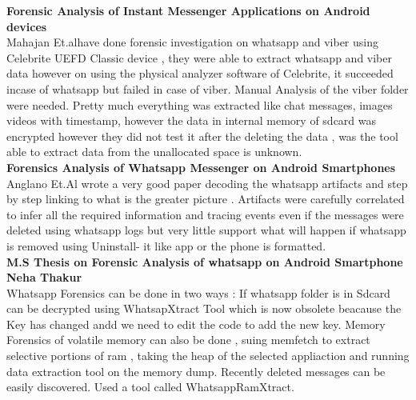 \textbf{Forensic Analysis of Instant Messenger Applications on Android devices}\\
Mahajan Et.al\cite{mahajan2013}have done forensic investigation on whatsapp and viber using Celebrite UEFD Classic device , they were able to extract whatsapp and viber data however on using the physical analyzer software of Celebrite, it succeeded incase of whatsapp but failed in case of viber. Manual Analysis of the viber folder were needed. Pretty much everything was extracted like chat messages, images videos with timestamp, however the data in internal memory of sdcard was encrypted however they did not test it after the deleting the data , was the tool able to extract data from the unallocated space is unknown.\\
\textbf{Forensics Analysis of Whatsapp Messenger on Android Smartphones }\\
Anglano Et.Al \cite{anglano_2014} wrote a very good paper decoding the whatsapp artifacts and step by step linking to what is the greater picture . Artifacts were carefully correlated to infer all the required information and tracing events even if the messages were deleted using whatsapp logs but very little support what will happen if whatsapp is removed using Uninstall- it like app or the phone is formatted.\\
\textbf{M.S Thesis on Forensic Analysis of whatsapp on Android Smartphone 
Neha Thakur }\\
Whatsapp \cite{Thakur2013}  Forensics can be done in two ways : If whatsapp folder is in Sdcard can be decrypted using WhatsapXtract Tool which is now obsolete beacause the Key has changed andd we need to edit the code to add the new key. Memory Forensics of volatile memory can also be done , suing memfetch to extract selective portions of ram , taking the heap of the selected appliaction and running data extraction tool on the memory dump. Recently deleted messages can be easily 
discovered. Used a tool called WhatsappRamXtract. \\
